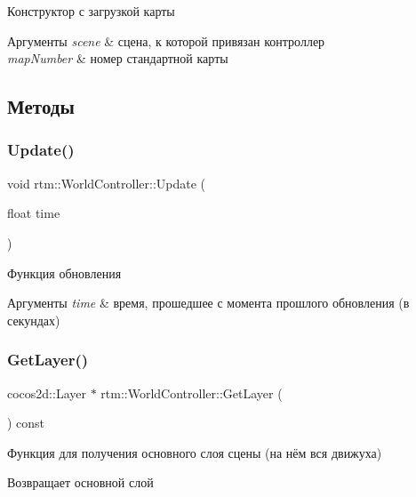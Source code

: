 Конструктор с загрузкой карты 
\begin{DoxyParams}{Аргументы}
{\em scene} & сцена, к которой привязан контроллер \\
\hline
{\em map\+Number} & номер стандартной карты \\
\hline
\end{DoxyParams}


\subsection{Методы}
\mbox{\label{classrtm_1_1_world_controller_a6b97a9ccc241734be2d68198de15068f}} 
\subsubsection{\texorpdfstring{Update()}{Update()}}
{\footnotesize\ttfamily void rtm\+::\+World\+Controller\+::\+Update (\begin{DoxyParamCaption}\item[{float}]{time }\end{DoxyParamCaption})}

Функция обновления 
\begin{DoxyParams}{Аргументы}
{\em time} & время, прошедшее с момента прошлого обновления (в секундах) \\
\hline
\end{DoxyParams}
\mbox{\label{classrtm_1_1_world_controller_a74bfc6a22a7091dc2668b08cd79f8aca}} 
\subsubsection{\texorpdfstring{Get\+Layer()}{GetLayer()}}
{\footnotesize\ttfamily cocos2d\+::\+Layer $\ast$ rtm\+::\+World\+Controller\+::\+Get\+Layer (\begin{DoxyParamCaption}{ }\end{DoxyParamCaption}) const}

Функция для получения основного слоя сцены (на нём вся движуха) \begin{DoxyReturn}{Возвращает}
основной слой 
\end{DoxyReturn}
\mbox{\label{classrtm_1_1_world_controller_af845be3c9945c0a2250f32e134a04294}} 
